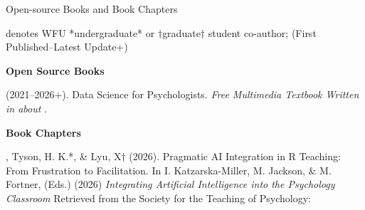 

\begin{rSection}{\textrm{Open-source Books and Book Chapters}}%
\vspace{-1mm}\begin{center}\footnotesize{denotes WFU *undergraduate* or $\dagger$graduate$\dagger$ student co-author; (First Published–Latest Update+)}\end{center}\vspace{-1mm}
{\large {\bf Open Source Books}}\begin{etaremune}
\item  \meb (2021–2026+). Data Science for Psychologists. \textit{Free Multimedia Textbook Written in \R about \R}. 
\end{etaremune}
{\large \bf Book Chapters}
\begin{etaremune}
\item \meb, Tyson, H. K.*, \& Lyu, X$\dagger$ (2026). Pragmatic AI Integration in R Teaching: From Frustration to Facilitation.  In I. Katzarska-Miller, M. Jackson, \& M. Fortner,  (Eds.) (2026) \textit{Integrating Artificial Intelligence into the Psychology Classroom} Retrieved from the Society for the Teaching of Psychology: \href{https://teachpsych.org/ebooks/genai}{\small\color{blue}{teachpsych.org/ebooks/genai}}
\end{etaremune}
\end{rSection}%
